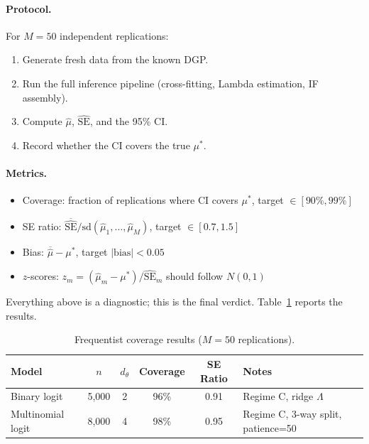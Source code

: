 \paragraph{Protocol.} For $M = 50$ independent replications:
\begin{enumerate}
    \item Generate fresh data from the known DGP.
    \item Run the full inference pipeline (cross-fitting, Lambda estimation, IF assembly).
    \item Compute $\hat{\mu}$, $\widehat{\mathrm{SE}}$, and the 95\% CI.
    \item Record whether the CI covers the true $\mu^*$.
\end{enumerate}

\paragraph{Metrics.}
\begin{itemize}
    \item Coverage: fraction of replications where CI covers $\mu^*$, target $\in [90\%, 99\%]$
    \item SE ratio: $\overline{\widehat{\mathrm{SE}}} / \mathrm{sd}(\hat{\mu}_1, \ldots, \hat{\mu}_M)$, target $\in [0.7, 1.5]$
    \item Bias: $\overline{\hat{\mu}} - \mu^*$, target $|\text{bias}| < 0.05$
    \item $z$-scores: $z_m = (\hat{\mu}_m - \mu^*)/\widehat{\mathrm{SE}}_m$ should follow $N(0,1)$
\end{itemize}

Everything above is a diagnostic; this is the final verdict. Table~\ref{tab:coverage_results} reports the results.

\begin{table}[ht]
\centering
\caption{Frequentist coverage results ($M=50$ replications).}\label{tab:coverage_results}
\begin{tabular}{lccccl}
\toprule
\textbf{Model} & $n$ & $d_\theta$ & \textbf{Coverage} & \textbf{SE Ratio} & \textbf{Notes} \\
\midrule
Binary logit      & 5,000  & 2 & 96\% & 0.91 & Regime C, ridge $\Lambda$ \\
Multinomial logit & 8,000  & 4 & 98\% & 0.95 & Regime C, 3-way split, patience=50 \\
\bottomrule
\end{tabular}
\end{table}

